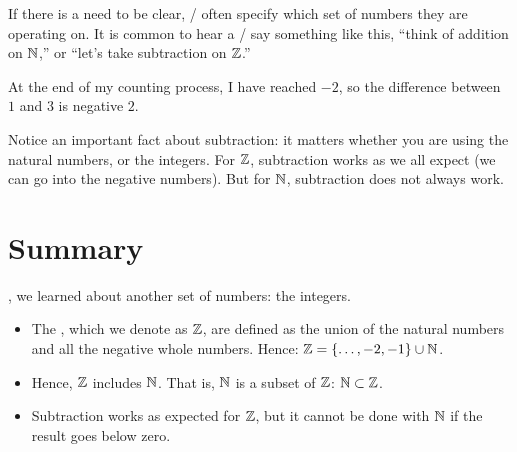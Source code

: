 \documentclass[../../../main.tex]{subfiles}
\begin{document}
\begin{aside}
  \begin{remark}
    If there is a need to be clear, \mathers/ often specify which set of numbers they are operating on. It is common to hear a \mather/ say something like this, ``think of addition on $\Nats/$,'' or ``let's take subtraction on $\Ints/$.''
  \end{remark}
\end{aside}

At the end of my counting process, I have reached $-2$, so the difference between $1$ and $3$ is negative $2$.

Notice an important fact about subtraction: it matters whether you are using the natural numbers, or the integers. For $\Ints/$, subtraction works as we all expect (we can go into the negative numbers). But for $\Nats/$, subtraction does not always work. 


\section{Summary}

, we learned about another set of numbers: the integers.

\begin{itemize}

  \item The , which we denote as $\Ints/$, are defined as the union of the natural numbers and all the negative whole numbers. Hence: $\Ints/ = \{ \ldots, -2, -1 \} \cup \Nats/$.
  
  \item Hence, $\Ints/$ includes $\Nats/$. That is, $\Nats/$ is a subset of $\Ints/$: $\Nats/ \subset \Ints/$.
  
  \item Subtraction works as expected for $\Ints/$, but it cannot be done with $\Nats/$ if the result goes below zero.

\end{itemize}
\end{document}
